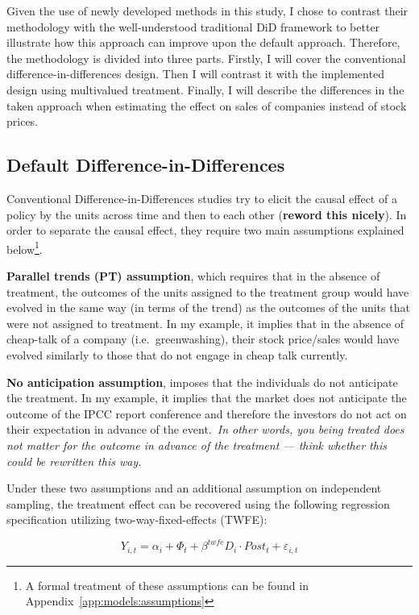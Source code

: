 \documentclass[12pt]{article}
\begin{document}
Given the use of newly developed methods in this study, I chose to contrast their methodology with the well-understood traditional DiD framework to better illustrate how this approach can improve upon the default approach. Therefore, the methodology is divided into three parts. Firstly, I will cover the conventional difference-in-differences design. Then I will contrast it with the implemented design using multivalued treatment. Finally, I will describe the differences in the taken approach when estimating the effect on sales of companies instead of stock prices.


\subsection{Default Difference-in-Differences}

Conventional Difference-in-Differences studies try to elicit the causal effect of a policy by the units across time and then to each other (\textbf{reword this nicely}). In order to separate the causal effect, they require two main assumptions explained below\footnote{A formal treatment of these assumptions can be found in Appendix~\ref{app:models:assumptions}}. 

\textbf{Parallel trends (PT) assumption}, which requires that in the absence of treatment, the outcomes of the units assigned to the treatment group would have evolved in the same way (in terms of the trend) as the outcomes of the units that were not assigned to treatment. In my example, it implies that in the absence of cheap-talk of a company (i.e.\ greenwashing), their stock price/sales would have evolved similarly to those that do not engage in cheap talk currently. 

\textbf{No anticipation assumption}, imposes that the individuals do not anticipate the treatment. In my example, it implies that the market does not anticipate the outcome of the IPCC report conference and therefore the investors do not act on their expectation in advance of the event.\ \textit{In other words, you being treated does not matter for the outcome in advance of the treatment --- think whether this could be rewritten this way.}

Under these two assumptions and an additional assumption on independent sampling, the treatment effect can be recovered using the following regression specification utilizing two-way-fixed-effects (TWFE):

\begin{equation}
    Y_{i,t} = \alpha_i + \Phi_t + \beta^{twfe} D_{i} \cdot Post_{t} + \varepsilon_{i,t}
\end{equation}
\end{document}
